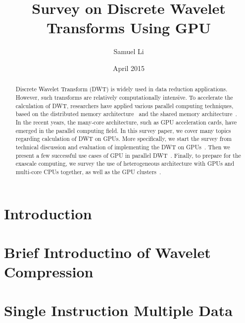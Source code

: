 \documentclass{article}
\title{Survey on Discrete Wavelet Transforms Using GPU}
\author{Samuel Li}
\date{April 2015}
\begin{document}
\maketitle

\begin{abstract}
Discrete Wavelet Transform (DWT) is widely used in data reduction applications.
%
However, such transforms are relatively computationally intensive.
%
To accelerate the calculation of DWT, researchers have applied various parallel
computing techniques, based on the distributed memory architecture~\cite{
chadha2002scalable, woo1995parallel, uhl1996wavelet, nielsen1997scalable}
and the shared memory architecture~\cite{
lucka2000parallel, uhl2000optimization,kutil1999hardware}.
%
In the recent years, the many-core architecture, such as GPU acceleration 
cards, have emerged in the parallel computing field.
%
In this survey paper, we cover many topics regarding calculation of DWT on GPUs.
%
More specifically, we start the survey from technical discussion and evaluation
of implementing the DWT on GPUs~\cite{tenllado2008parallel, van2011accelerating,
garcia2005gpu}.
%
Then we present a few successful use cases of GPU in parallel DWT~\cite{
strengert2004hierarchical, strengert2006pyramid, wong2007discrete,
treib2012turbulence}.
%
Finally, to prepare for the exascale computing, we survey the use of 
heterogeneous architecture with GPUs and multi-core CPUs together,
as well as the GPU clusters~\cite{franco2009parallel, franco2010parallel,
strengert2005large, franco20122d, rossinelli2011multicore}.
%
\end{abstract}

\section{Introduction}

\section{Brief Introductino of Wavelet Compression}

\section{Single Instruction Multiple Data}
\cite{lee1994parallel}

 
%

\end{document}
